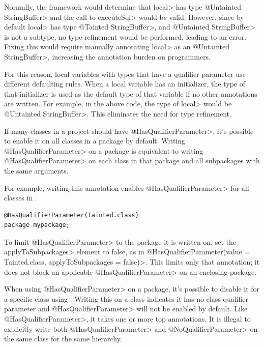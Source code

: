 Normally, the framework would determine that \<local> has type \<@Untainted
StringBuffer> and the call to \<executeSql> would be valid. However, since by
default \<local> has type \<@Tainted StringBuffer>, and
\<@Untainted StringBuffer> is not a subtype, no type refinement would be
performed, leading to an error. Fixing this would require manually annotating
\<local> as an \<@Untainted StringBuffer>, increasing the annotation burden on
programmers.

For this reason, local variables with types that have a qualifier parameter use
different defaulting rules. When a local variable has an initializer, the type
of that initializer is used as the default type of that variable if no other
annotations are written. For example, in the above code, the type of \<local>
would be \<@Untainted StringBuffer>. This eliminates the need for type
refinement.


If many classes in a project should have \<@HasQualifierParameter>, it's
possible to enable it on all classes in a package by default. Writing
\<@HasQualifierParameter> on a package is equivalent to writing
\<@HasQualifierParameter> on each class in that package and all subpackages with
the same arguments.

For example, writing this annotation enables \<@HasQualifierParameter>
for all classes in .

\begin{Verbatim}
@HasQualifierParameter(Tainted.class)
package mypackage;
\end{Verbatim}

To limit \<@HasQualifierParameter> to the package it is written on, set the
\<applyToSubpackages> element to false, as in
\<@HasQualifierParameter(value = Tainted.class, applyToSubpackages = false)>.
This limits only that annotation; it does not block an applicable
\<@HasQualifierParameter> on an enclosing package.

When using \<@HasQualifierParameter> on a package, it's possible to disable it
for a specific class using .
Writing this on a class indicates it has no class qualifier parameter and
\<@HasQualifierParameter> will not be enabled by default. Like
\<@HasQualifierParameter>, it takes one or more top annotations. It is illegal
to explicitly write both \<@HasQualifierParameter> and \<@NoQualifierParameter>
on the same class for the same hierarchy.

